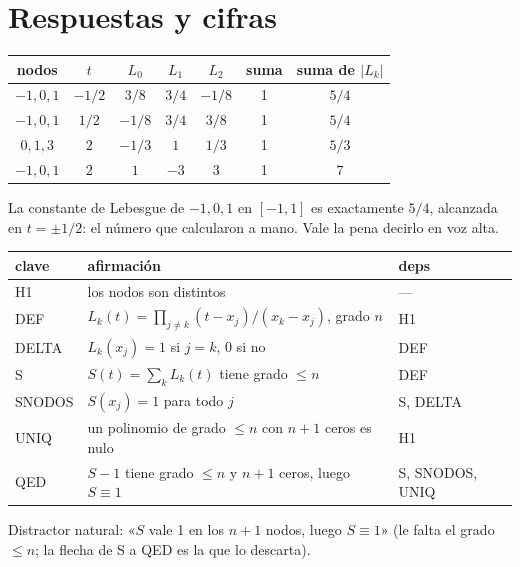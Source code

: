 \section{Respuestas y cifras}
\begin{preguntas}
\end{preguntas}
\begin{center}
\begin{tabular}{ccccccc}
\toprule
\textbf{nodos} & $t$ & $L_0$ & $L_1$ & $L_2$ & \textbf{suma} & \textbf{suma de $|L_k|$} \\
\midrule
$-1,0,1$ & $-1/2$ & $3/8$ & $3/4$ & $-1/8$ & 1 & $5/4$ \\
$-1,0,1$ & $1/2$ & $-1/8$ & $3/4$ & $3/8$ & 1 & $5/4$ \\
$0,1,3$ & $2$ & $-1/3$ & $1$ & $1/3$ & 1 & $5/3$ \\
$-1,0,1$ & $2$ & $1$ & $-3$ & $3$ & 1 & $7$ \\
\bottomrule
\end{tabular}
\end{center}
La constante de Lebesgue de $-1,0,1$ en $[-1,1]$ es exactamente $5/4$, alcanzada en $t=\pm 1/2$: el número que calcularon a mano. Vale la pena decirlo en voz alta.

\begin{preguntas}
\end{preguntas}
\begin{center}
\begin{tabularx}{\linewidth}{@{}l X l@{}}
\toprule
\textbf{clave} & \textbf{afirmación} & \textbf{deps} \\
\midrule
H1 & los nodos son distintos & — \\
DEF & $L_k(t)=\prod_{j\neq k}(t-x_j)/(x_k-x_j)$, grado $n$ & H1 \\
DELTA & $L_k(x_j)=1$ si $j=k$, 0 si no & DEF \\
S & $S(t)=\sum_k L_k(t)$ tiene grado $\le n$ & DEF \\
SNODOS & $S(x_j)=1$ para todo $j$ & S, DELTA \\
UNIQ & un polinomio de grado $\le n$ con $n+1$ ceros es nulo & H1 \\
QED & $S-1$ tiene grado $\le n$ y $n+1$ ceros, luego $S\equiv 1$ & S, SNODOS, UNIQ \\
\bottomrule
\end{tabularx}
\end{center}
Distractor natural: «$S$ vale 1 en los $n+1$ nodos, luego $S\equiv 1$» (le falta el grado $\le n$; la flecha de S a QED es la que lo descarta).


